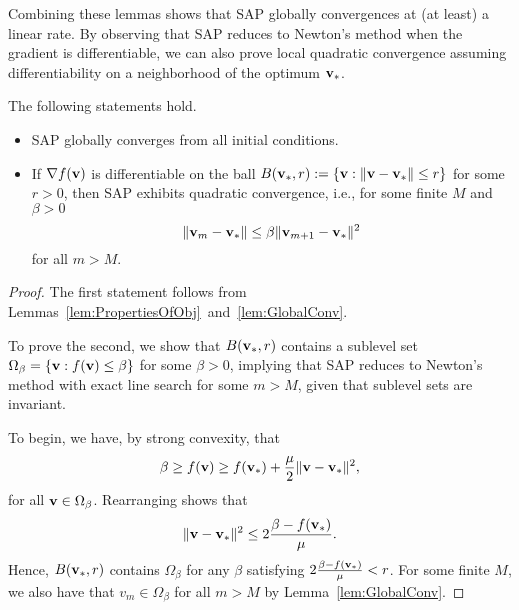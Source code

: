 Combining these lemmas shows that SAP globally convergences at (at least) a
linear rate.  By observing that SAP reduces to Newton's
method when the gradient is differentiable, we can also prove local quadratic
convergence assuming differentiability on a neighborhood of
the optimum ${\mathbf{v}}_*$. 
\begin{theorem}
  The following statements hold.
  \begin{itemize}
    \item SAP globally converges from all initial conditions.
    \item If $\nabla f({\mathbf{v}})$  is differentiable on the ball $B({\mathbf{v}}_*, r) := \{ {\mathbf{v}} :  \|{\mathbf{v}}-{\mathbf{v}}_*\| \le r\}$
  for some $r > 0$, then SAP exhibits quadratic convergence, i.e., for some finite
  $M$ and $\beta > 0$
  \[
    \|{\mathbf{v}}_m - {\mathbf{v}}_*\| \le \beta \|{\mathbf{v}}_{m+1} - {\mathbf{v}}_*\|^2
  \]
  for all $m > M$.
  \end{itemize}

  \begin{proof}

    The first statement follows from Lemmas~\ref{lem:PropertiesOfObj}~and~\ref{lem:GlobalConv}.

  To prove the second, we show that $B({\mathbf{v}}_*, r)$
    contains a sublevel set $\Omega_{\beta} = \{ {\mathbf{v}} : f({\mathbf{v}}) \le \beta\}$ for some
  $\beta > 0$,  implying that SAP 
  reduces to Newton's method with exact line search for some $m > M$,
 given that sublevel sets are invariant. 

  To begin, we have, by strong convexity, that
  \begin{equation}
    \beta \ge f(\vx) \ge f(\vx_*)  + \frac{\mu}{2} \|\vx-\vx_*\|^2,
    \label{eq:strong_convexity_at_differentiable_optimal}
  \end{equation}
    for all ${\mathbf{v}} \in \Omega_{\beta}$.
    Rearranging shows that
    \[
      \|{\mathbf{v}}-{\mathbf{v}}_*\|^2 \le 2\frac{\beta- f({\mathbf{v}}_*)}{\mu}.
    \]
    Hence, $B({\mathbf{v}}_*, r)$ contains
    $\Omega_{\beta}$ for any $\beta$ satisfying $2\frac{\beta- f({\mathbf{v}}_*)}{\mu} < r$.
    For some finite $M$, we also have that $v_m \in \Omega_{\beta}$ for all $m > M$ 
    by Lemma~\ref{lem:GlobalConv}.


\end{proof}
\end{theorem}
